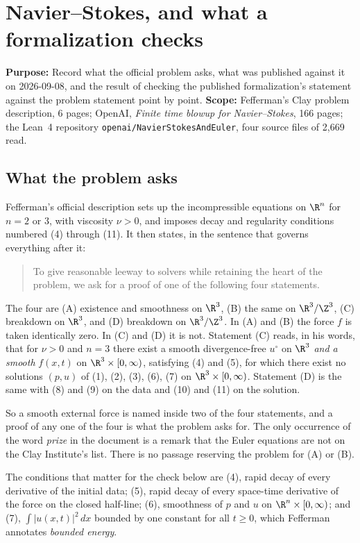 \chapter{Navier--Stokes, and what a formalization checks}

\textbf{Purpose:} Record what the official problem asks, what was published against it on
2026-09-08, and the result of checking the published formalization's statement against the problem
statement point by point. \textbf{Scope:} Fefferman's Clay problem description, 6 pages; OpenAI,
\emph{Finite time blowup for Navier--Stokes}, 166 pages; the Lean~4 repository
\texttt{openai/\allowbreak{}NavierStokesAndEuler}, four source files of 2{,}669 read.

\section{What the problem asks}

Fefferman's official description sets up the incompressible equations on $\R^n$ for $n=2$ or $3$,
with viscosity $\nu > 0$, and imposes decay and regularity conditions numbered (4) through (11). It
then states, in the sentence that governs everything after it:

\begin{quote}
To give reasonable leeway to solvers while retaining the heart of the problem, we ask for a proof
of one of the following four statements.
\end{quote}

The four are (A) existence and smoothness on $\R^3$, (B) the same on $\R^3/\Z^3$, (C) breakdown on
$\R^3$, and (D) breakdown on $\R^3/\Z^3$. In (A) and (B) the force $f$ is taken identically zero. In
(C) and (D) it is not. Statement (C) reads, in his words, that for $\nu>0$ and $n=3$ there exist a
smooth divergence-free $u^\circ$ on $\R^3$ \emph{and a smooth} $f(x,t)$ on
$\R^3\times[0,\infty)$, satisfying (4) and (5), for which there exist no solutions $(p,u)$ of (1),
(2), (3), (6), (7) on $\R^3\times[0,\infty)$. Statement (D) is the same with (8) and (9) on the data
and (10) and (11) on the solution.

So a smooth external force is named inside two of the four statements, and a proof of any one of
the four is what the problem asks for. The only occurrence of the word \emph{prize} in the document
is a remark that the Euler equations are not on the Clay Institute's list. There is no passage
reserving the problem for (A) or (B).

The conditions that matter for the check below are (4), rapid decay of every derivative of the
initial data; (5), rapid decay of every space-time derivative of the force on the closed half-line;
(6), smoothness of $p$ and $u$ on $\R^n\times[0,\infty)$; and (7), $\int|u(x,t)|^2\,dx$ bounded by
one constant for all $t\ge0$, which Fefferman annotates \emph{bounded energy}.

